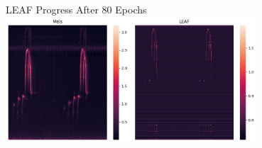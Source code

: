 \begin{frame}{LEAF Progress}
    \centering
    After 80 Epochs
    \break
    \includegraphics[height=0.7\textheight,width=0.7\textwidth,keepaspectratio]{images/LEAF_80.png}
\end{frame}